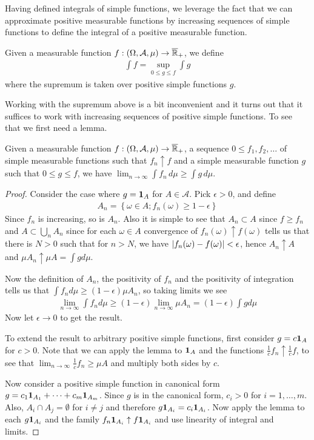 Having defined integrals of simple functions, we leverage the fact
that we can approximate positive measurable functions by increasing
sequences of simple functions to define the integral of a positive
measurable function.
\begin{defn}Given a measurable function $f : (\Omega, \mathcal{A},
  \mu) \to \overline{\mathbb{R}}_+$, we define 
\begin{align*}\int f = \sup_{0 \leq g \leq f} \int g
\end{align*}
where the supremum is taken over positive simple functions $g$.
\end{defn}
Working with the supremum above is a bit inconvenient and it turns out
that it suffices to work with increasing sequences of positive simple
functions.  To see that we first need a lemma.
\begin{lem}Given a measurable function $f : (\Omega,
  \mathcal{A}, \mu) \to \overline{\mathbb{R}}_+$, a sequence $0 \leq f_1, f_2, \dots$ of simple measurable
  functions such that $f_n \uparrow f$ and a simple measurable
  function $g$ such that $0 \leq g \leq f$, we have $\lim_{n \to \infty} \int f_n
  \, d\mu
  \geq \int g \, d\mu$.
\end{lem}
\begin{proof}Consider the case where $g = \textbf{1}_{A}$ for $A
  \in \mathcal{A}$.  Pick $\epsilon > 0$, and define
\begin{align*}
A_n = \left \{ \omega \in A; f_n(\omega) \geq 1 - \epsilon \right \}
\end{align*}
Since $f_n$ is increasing, so is $A_n$.  Also it is simple to see that
$A_n \subset A$ since $f \geq f_n$ and $A \subset \bigcup_n A_n$ since
for each $\omega \in A$ convergence of $f_n(\omega) \uparrow
f(\omega)$ tells us that there is $N > 0$ such that for $n > N$, we
have $\left \vert f_n(\omega) - f(\omega) \right \vert < \epsilon$, hence $A_n \uparrow
A$ and 
$\mu A_n \uparrow \mu A = \int g d \mu$.

Now the definition of $A_n$, the positivity of $f_n$ and the
positivity of integration tells us that
$\int f_n d \mu \geq (1 - \epsilon) \mu A_n$, so taking limits we see
\begin{align*}
\lim_{n \to \infty} \int f_n d \mu \geq (1 - \epsilon) \lim_{n \to
  \infty} \mu A_n = (1-\epsilon) \int g d \mu
\end{align*}
Now let $\epsilon \to 0$ to get the result.

To extend the result to arbitrary positive simple functions,  first consider $g
= c \textbf{1}_{A}$ for $c > 0$.  Note that we can apply the
lemma to $\textbf{1}_{A}$ and the functions $\frac{1}{c}f_n
\uparrow \frac{1}{c}f$, to see that $\lim_{n \to \infty}
\frac{1}{c}f_n \geq \mu A$ and multiply both sides by $c$.

Now consider a positive simple function in canonical form $g = c_1
\textbf{1}_{A_1} + \cdots + c_m \textbf{1}_{A_m}$.  Since $g$
is in the canonical form, $c_i > 0$ for $i=1, \dots, m$.  Also, $A_i \cap A_j = \emptyset$ for $i \neq j$
and therefore $g \textbf{1}_{A_i}  = c_i \textbf{1}_{A_i}$.
Now apply the lemma to each $g \textbf{1}_{A_i} $ and the family
$f_n \textbf{1}_{A_i}  \uparrow f \textbf{1}_{A_i} $ and use
linearity of integral and limits.
\end{proof}
